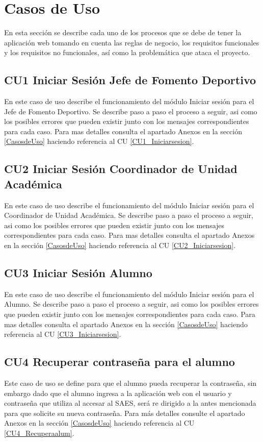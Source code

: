 	\section{Casos de Uso}
	En esta sección se describe cada uno de los procesos que se debe de tener la aplicación web tomando en cuenta las reglas de negocio, los requisitos funcionales y los requisitos no funcionales, así como la problemática que ataca el proyecto.
		\subsection{CU1 Iniciar Sesión Jefe de Fomento Deportivo}
		\noindent En este caso de uso describe el funcionamiento del módulo Iniciar sesión para el Jefe de Fomento Deportivo. Se describe paso a paso el proceso a seguir, asi como los posibles errores que pueden existir junto con los mensajes correspondientes para cada caso. Para mas detalles consulta el apartado Anexos en la sección \ref{CasosdeUso} haciendo referencia al CU \ref{CU1_Iniciarsesion}. \\
		
		\subsection{CU2 Iniciar Sesión Coordinador de Unidad Académica}
		\noindent En este caso de uso describe el funcionamiento del módulo Iniciar sesión para el Coordinador de Unidad Académica. Se describe paso a paso el proceso a seguir, asi como los posibles errores que pueden existir junto con los mensajes correspondientes para cada caso. Para mas detalles consulta el apartado Anexos en la sección \ref{CasosdeUso} haciendo referencia al CU \ref{CU2_Iniciarsesion}. \\
		
		\subsection{CU3 Iniciar Sesión Alumno}
		\noindent En este caso de uso describe el funcionamiento del módulo Iniciar sesión para el Alumno. Se describe paso a paso el proceso a seguir, asi como los posibles errores que pueden existir junto con los mensajes correspondientes para cada caso. Para mas detalles consulta el apartado Anexos en la sección \ref{CasosdeUso} haciendo referencia al CU \ref{CU3_Iniciarsesion}.\\
		
		\subsection{CU4 Recuperar contraseña para el alumno}
		\noindent Este caso de uso se define para que el alumno pueda recuperar la contraseña, sin embargo dado que el alumno ingresa a la aplicación web con el usuario y contraseña que utiliza al accesar al SAES, será re dirigido a la antes mencionada para que solicite su nueva contraseña. Para más detalles consulte el apartado Anexos en la sección \ref{CasosdeUso} haciendo referencia al CU \ref{CU4_Recuperaalum}. \\ \pagebreak
		
